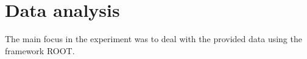 \section{Data analysis}
The main focus in the experiment was to deal with the provided data using the framework ROOT.
